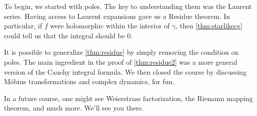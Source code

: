 \documentclass[../notes.tex]{subfiles}
\begin{document}
To begin, we started with poles. The key to understanding them was the Laurent series.
\laurentdefi*
\noindent Having access to Laurent expansions gave us a Residue theorem.
\residuethm*
\noindent In particular, if $f$ were holomorphic within the interior of $\gamma$, then \autoref{thm:starlikecg} could tell us that the integral should be $0$.

It is possible to generalize \autoref{thm:residue} by simply removing the condition on poles.
\residueagainthm*
\noindent The main ingredient in the proof of \autoref{thm:residue2} was a more general version of the Cauchy integral formula.
\cifagainagainthm*
\noindent We then closed the course by discussing M\"obius transformations and complex dynamics, for fun.
\begin{remark}
	In a future course, one might see Weierstrass factorization, the Riemann mapping theorem, and much more. We'll see you there.
\end{remark}
\end{document}
